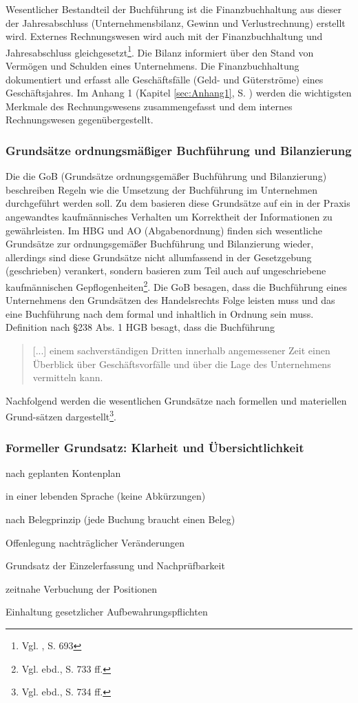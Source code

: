 Wesentlicher Bestandteil der Buchführung ist die Finanzbuchhaltung aus dieser der Jahresabschluss (Unternehmensbilanz,  Gewinn und Verlustrechnung) erstellt wird. Externes Rechnungswesen wird auch mit der Finanzbuchhaltung und Jahresabschluss gleichgesetzt\footnote{Vgl. \cite{Wohe2000}, S. 693}. Die Bilanz informiert über den Stand von Vermögen und Schulden eines Unternehmens. Die Finanzbuchhaltung dokumentiert
und erfasst alle Geschäftsfälle (Geld- und Güterströme) eines Geschäftsjahres.
Im Anhang 1 (Kapitel \ref{sec:Anhang1}, S. \pageref{sec:Anhang1}) werden die wichtigsten Merkmale des Rechnungswesens zusammengefasst und dem internes Rechnungswesen gegenübergestellt.

\subsubsection{Grundsätze ordnungsmäßiger Buchführung und Bilanzierung}
Die die GoB (Grundsätze ordnungsgemäßer Buchführung und Bilanzierung) beschreiben Regeln wie die Umsetzung der Buchführung im Unternehmen durchgeführt werden soll. Zu dem basieren diese Grundsätze auf ein in der Praxis angewandtes kaufmännisches Verhalten um Korrektheit der Informationen zu gewährleisten. Im HBG und AO (Abgabenordnung) finden sich wesentliche Grundsätze zur ordnungsgemäßer Buchführung und Bilanzierung wieder, allerdings sind diese Grundsätze nicht allumfassend in der Gesetzgebung (geschrieben) verankert, sondern basieren zum Teil auch auf ungeschriebene kaufmännischen Gepflogenheiten\footnote{Vgl. ebd., S. 733 ff.}. Die GoB besagen, dass die Buchführung eines Unternehmens den Grundsätzen des Handelsrechts Folge leisten muss und das eine Buchführung nach dem formal und inhaltlich in Ordnung sein muss. 
Definition nach §238 Abs. 1 HGB besagt, dass die Buchführung \begin{quote}[...] einem sachverständigen Dritten innerhalb angemessener Zeit einen Überblick über Geschäftsvorfälle und über die Lage des Unternehmens vermitteln kann.\end{quote}

Nachfolgend werden die wesentlichen Grundsätze nach formellen und materiellen Grund-sätzen dargestellt\footnote{Vgl. ebd., S. 734 ff.}.
\subsubsection*{Formeller Grundsatz: Klarheit und Übersichtlichkeit}
\begin{compactitem} 
\item  nach geplanten Kontenplan
\item  in einer lebenden Sprache (keine Abkürzungen)
\item  nach Belegprinzip (jede Buchung braucht einen Beleg)
\item  Offenlegung nachträglicher Veränderungen
\item  Grundsatz der Einzelerfassung und Nachprüfbarkeit
\item  zeitnahe Verbuchung der Positionen
\item  Einhaltung gesetzlicher Aufbewahrungspflichten
\end{compactitem}
